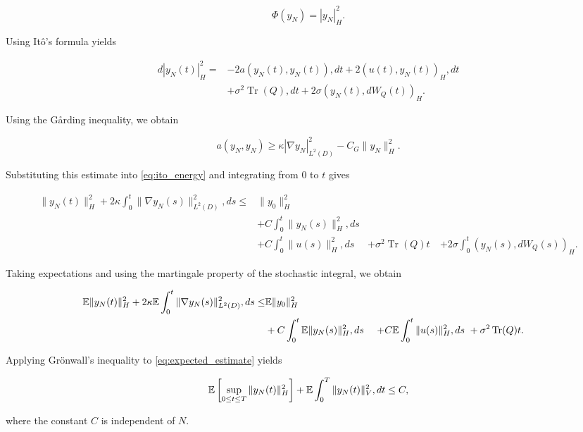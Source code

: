\[
\Phi(y_N)
=
|y_N|_H^2.
\]

Using It\^o's formula yields

\begin{equation}
\begin{aligned}
d|y_N(t)|_H^2
=
&
-2a(y_N(t),y_N(t)),dt
+
2(u(t),y_N(t))_H,dt
\\
&
+
\sigma^2
\operatorname{Tr}(Q),dt
+
2\sigma
(y_N(t),dW_Q(t))_H.
\end{aligned}
\label{eq:ito_energy}
\end{equation}

Using the G{\aa}rding inequality, we obtain

\[
a(y_N,y_N)
\ge
\kappa
|\nabla y_N|_{L^2(D)}^2
-
C_G
\|y_N\|_H^2.
\]

Substituting this estimate into \eqref{eq:ito_energy} and integrating from \(0\) to \(t\) gives

\begin{equation}
\begin{aligned}
\|y_N(t)\|_H^2
+
2\kappa
\int_0^t
\|\nabla y_N(s)\|_{L^2(D)}^2,ds
\le
&
\|y_0\|_H^2
\\
&
+
C
\int_0^t
\|y_N(s)\|_H^2,ds
\\
&
+
C
\int_0^t
\|u(s)\|_H^2,ds
\
&
+
\sigma^2
\operatorname{Tr}(Q)t
\
&
+
2\sigma
\int_0^t
(y_N(s),dW_Q(s))_H.
\end{aligned}
\label{eq:energy_estimate}
\end{equation}

Taking expectations and using the martingale property of the stochastic integral, we obtain

\begin{equation}
\begin{aligned}
\mathbb{E}\|y_N(t)\|_H^2
+
2\kappa
\mathbb{E}
\int_0^t
\|\nabla y_N(s)\|_{L^2(D)}^2,ds
\le
&
\mathbb{E}\|y_0\|_H^2
\\
&
+
C
\int_0^t
\mathbb{E}\|y_N(s)\|_H^2,ds
\
&
+
C
\mathbb{E}
\int_0^t
\|u(s)\|_H^2,ds
\
&
+
\sigma^2
\operatorname{Tr}(Q)t.
\end{aligned}
\label{eq:expected_estimate}
\end{equation}

Applying Gr\"onwall's inequality to \eqref{eq:expected_estimate} yields

\begin{equation}
\mathbb{E}
\left[
\sup_{0\le t\le T}
\|y_N(t)\|_H^2
\right]
+
\mathbb{E}
\int_0^T
\|y_N(t)\|_V^2,dt
\le C,
\label{eq:uniform_bound}
\end{equation}

where the constant \(C\) is independent of \(N\).

